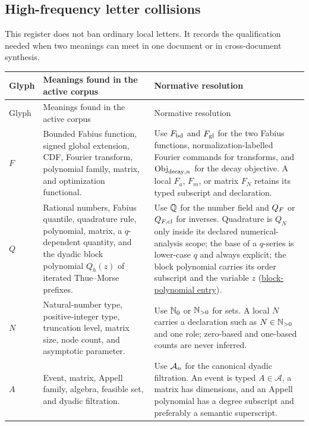 \documentclass[11pt,oneside]{article}
\theoremstyle{definition}
\theoremstyle{remark}
\begin{document}
\subsection{High-frequency letter collisions}

This register does not ban ordinary local letters.  It records the qualification needed
when two meanings can meet in one document or in cross-document synthesis.

\begingroup\small
\begin{longtable}{@{}p{}p{}p{}@{}}
\toprule
Glyph & Meanings found in the active corpus & Normative resolution\\
\midrule
\endfirsthead
\toprule
Glyph & Meanings found in the active corpus & Normative resolution\\
\midrule
\endhead
$F$ & Bounded Fabius function, signed global extension, CDF, Fourier transform,
polynomial family, matrix, and optimization functional. & Use $F_{\mathrm{bd}}$ and
$F_{\mathrm{gl}}$ for the two Fabius functions, normalization-labelled Fourier commands
for transforms, and $\operatorname{Obj}_{\mathrm{decay},n}$ for the decay objective.  A local
$F_a$, $F_m$, or matrix $F_N$ retains its typed subscript and declaration.\\
$Q$ & Rational numbers, Fabius quantile, quadrature rule, polynomial, matrix, a
$q$-dependent quantity, and the dyadic block polynomial $Q_h(z)$ of iterated
Thue--Morse prefixes. & Use $\mathbb{Q}$ for the number field and
$Q_{F}$ or $Q_{F,\mathrm{cl}}$ for inverses.  Quadrature is $Q_N$ only
inside its declared numerical-analysis scope; the base of a $q$-series is lower-case
$q$ and always explicit; the block polynomial carries its order subscript and the
variable $z$ (\hyperlink{notation:thue-morse-block-polynomial}{block-polynomial
entry}).\\
$N$ & Natural-number type, positive-integer type, truncation level, matrix size, node
count, and asymptotic parameter. & Use $\mathbb{N}_{0}$ or $\mathbb{N}_{>0}$ for
sets.  A local $N$ carries a declaration such as $N\in\mathbb{N}_{>0}$ and one role;
zero-based and one-based counts are never inferred.\\
$A$ & Event, matrix, Appell family, algebra, feasible set, and dyadic filtration. & Use
$\mathcal{A}_n$ for the canonical dyadic filtration.  An event is typed
$A\in\mathscr A$, a matrix has dimensions, and an Appell polynomial has a degree
subscript and preferably a semantic superscript.\\

\end{longtable}
\end{document}
